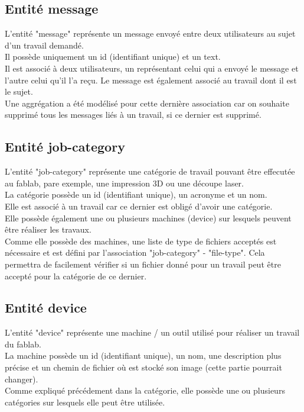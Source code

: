 \documentclass[
    iai, %
    il, %
]{heig-tb}
\begin{document}
\subsection{Entité message}
L'entité "message" représente un message envoyé entre deux utilisateurs au sujet d'un travail demandé.\\
Il possède uniquement un id (identifiant unique) et un text.\\
Il est associé à deux utilisateurs, un représentant celui qui a envoyé le message et l'autre celui qu'il l'a reçu. Le message est également associé au travail dont il est le sujet.\\
Une aggrégation a été modélisé pour cette dernière association car on souhaite supprimé tous les messages liés à un travail, si ce dernier est supprimé.

\subsection{Entité job-category}
L'entité "job-category" représente une catégorie de travail pouvant être effecutée au fablab, pare exemple, une impression 3D ou une découpe laser.\\
La catégorie possède un id (identifiant unique), un acronyme et un nom.\\
Elle est associé à un travail car ce dernier est obligé d'avoir une catégorie.\\
Elle possède également une ou plusieurs machines (device) sur lesquels peuvent être réaliser les travaux.\\
Comme elle possède des machines, une liste de type de fichiers acceptés est nécessaire et est défini par l'association "job-category" - "file-type". Cela permettra de facilement vérifier si un fichier donné pour un travail peut être accepté pour la catégorie de ce dernier.

\subsection{Entité device}
L'entité "device" représente une machine / un outil utilisé pour réaliser un travail du fablab.\\
La machine possède un id (identifiant unique), un nom, une description plus précise et un chemin de fichier où est stocké son image (cette partie pourrait changer).\\
Comme expliqué précédement dans la catégorie, elle possède une ou plusieurs catégories sur lesquels elle peut être utilisée.\\
\end{document}

